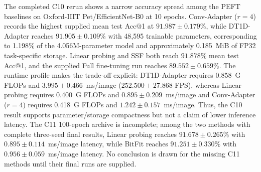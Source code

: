 \documentclass[pdflatex,sn-mathphys-num]{sn-jnl}
\theoremstyle{thmstyleone}
\theoremstyle{thmstyletwo}
\theoremstyle{thmstylethree}
\begin{document}
The completed C10 rerun shows a narrow accuracy spread among the PEFT baselines on Oxford-IIIT Pet/EfficientNet-B0 at 10 epochs. Conv-Adapter ($r=4$) records the highest supplied mean test Acc@1 at $91.987\pm0.179\%$, while DT1D-Adapter reaches $91.905\pm0.109\%$ with 48,595 trainable parameters, corresponding to 1.198\% of the 4.056M-parameter model and approximately 0.185~MiB of FP32 task-specific storage. Linear probing and SSF both reach $91.878\%$ mean test Acc@1, and the supplied Full fine-tuning run reaches $89.552\pm0.659\%$. The runtime profile makes the trade-off explicit: DT1D-Adapter requires 0.858~G FLOPs and $3.995\pm0.466$~ms/image ($252.500\pm27.868$ FPS), whereas Linear probing requires 0.400~G FLOPs and $0.895\pm0.209$~ms/image and Conv-Adapter ($r=4$) requires 0.418~G FLOPs and $1.242\pm0.157$~ms/image. Thus, the C10 result supports parameter/storage compactness but not a claim of lower inference latency. The C11 100-epoch archive is incomplete; among the two methods with complete three-seed final results, Linear probing reaches $91.678\pm0.265\%$ with $0.895\pm0.114$~ms/image latency, while BitFit reaches $91.251\pm0.330\%$ with $0.956\pm0.059$~ms/image latency. No conclusion is drawn for the missing C11 methods until their final runs are supplied.
\end{document}
